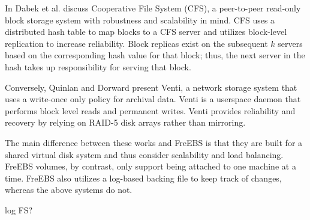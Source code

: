 In \cite{dabek2001wide} Dabek et al. discuss Cooperative File System (CFS), 
a peer-to-peer read-only block storage system with robustness and 
scalability in mind. CFS uses a distributed hash table to map blocks to a CFS
server and utilizes block-level replication to increase reliability. 
Block replicas exist on the subsequent $k$ servers based on the corresponding
hash value for that block; thus, the next server in the hash takes up 
responsibility for serving that block.  

Conversely, Quinlan and Dorward present Venti, a network storage system that
uses a write-once only policy for archival data\cite{quinlan2002venti}. Venti
is a userspace daemon that performs block level reads and permanent writes. 
Venti provides reliability and recovery by relying on RAID-5 disk arrays 
rather than mirroring.  

The main difference between these works and FreEBS is that they are built 
for a shared virtual disk system and thus consider scalability and load
balancing. FreEBS volumes, by contrast, only support being attached to one 
machine at a time. FreEBS also utilizes a log-based backing file to keep
track of changes, whereas the above systems do not.

\XXX log FS?


